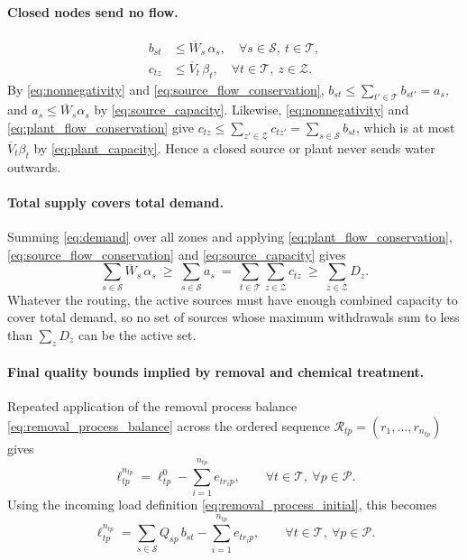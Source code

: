 \documentclass[10pt]{article}
\begin{document}
\paragraph{Closed nodes send no flow.}
\begin{align}
    b_{st} & \le \overline{W}_s\,\alpha_s, \quad \forall s \in \mathcal{S},\ t \in \mathcal{T}, \label{eq:closed_source} \\
    c_{tz} & \le \overline{V}_t\,\beta_t, \quad \forall t \in \mathcal{T},\ z \in \mathcal{Z}. \label{eq:closed_plant}
\end{align}
By \eqref{eq:nonnegativity} and \eqref{eq:source_flow_conservation}, $b_{st} \le \sum_{t' \in \mathcal{T}} b_{st'} = a_s$, and $a_s \le \overline{W}_s\alpha_s$ by \eqref{eq:source_capacity}.
Likewise, \eqref{eq:nonnegativity} and \eqref{eq:plant_flow_conservation} give $c_{tz} \le \sum_{z' \in \mathcal{Z}} c_{tz'} = \sum_{s \in \mathcal{S}} b_{st}$, which is at most $\overline{V}_t\beta_t$ by \eqref{eq:plant_capacity}.
Hence a closed source or plant never sends water outwards.

\paragraph{Total supply covers total demand.}
Summing \eqref{eq:demand} over all zones and applying \eqref{eq:plant_flow_conservation}, \eqref{eq:source_flow_conservation} and \eqref{eq:source_capacity} gives
\begin{equation}\label{eq:total_supply}
    \sum_{s \in \mathcal{S}} \overline{W}_s\,\alpha_s
    \ \ge\ \sum_{s \in \mathcal{S}} a_s
    \ =\ \sum_{t \in \mathcal{T}} \sum_{z \in \mathcal{Z}} c_{tz}
    \ \ge\ \sum_{z \in \mathcal{Z}} D_z.
\end{equation}
Whatever the routing, the active sources must have enough combined capacity to cover total demand, so no set of sources whose maximum withdrawals sum to less than $\sum_z D_z$ can be the active set.

\paragraph{Final quality bounds implied by removal and chemical treatment.}
Repeated application of the removal process balance \eqref{eq:removal_process_balance} across the ordered sequence $\mathcal{R}_{tp}=(r_1,\dots,r_{n_{tp}})$ gives
\begin{equation}\label{eq:implicit_removal_load}
    \ell^{n_{tp}}_{tp}
    =
    \ell^{0}_{tp}
    -
    \sum_{i=1}^{n_{tp}} e_{t r_i p},
    \qquad
    \forall t \in \mathcal{T},\ \forall p \in \mathcal{P}.
\end{equation}
Using the incoming load definition \eqref{eq:removal_process_initial}, this becomes
\begin{equation}\label{eq:implicit_removal_load_sources}
    \ell^{n_{tp}}_{tp}
    =
    \sum_{s \in \mathcal{S}} Q_{sp}\,b_{st}
    -
    \sum_{i=1}^{n_{tp}} e_{t r_i p},
    \qquad
    \forall t \in \mathcal{T},\ \forall p \in \mathcal{P}.
\end{equation}
\end{document}
